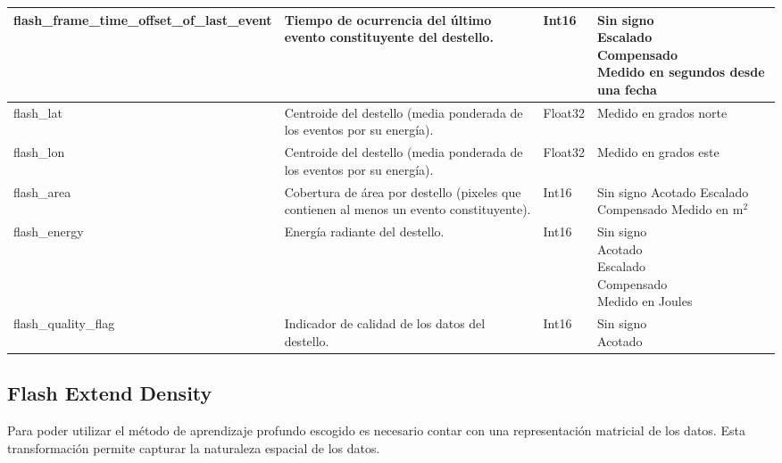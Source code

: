 \begin{table}[H]
\begin{tabular}{l|p{3cm}|p{1.15cm}|p{3.5cm}}
    flash\_frame\_time\_offset\_of\_last\_event &
    Tiempo de ocurrencia del último evento constituyente del destello. &
    Int16 &
    \parbox[t]{3.5cm}{Sin signo \\ Escalado \\ Compensado \\ Medido en segundos desde una fecha}\\ \hline

    flash\_lat &
    Centroide del destello (media ponderada de los eventos por su energía). &
    Float32 &
    \parbox[t]{3.5cm}{Medido en grados norte}\\ \hline

    flash\_lon &
    Centroide del destello (media ponderada de los eventos por su energía). &
    Float32 &
    \parbox[t]{3.5cm}{Medido en grados este}\\ \hline

    flash\_area &
    Cobertura de área por destello (pixeles que contienen al menos un evento constituyente). &
    Int16 &
    \parbox[t]{3.5cm}{Sin signo \\ Acotado \\ Escalado \\ Compensado \\ Medido en m$^2$}\\ \hline

    flash\_energy &
    Energía radiante del destello. &
    Int16 &
    \parbox[t]{3.5cm}{Sin signo \\ Acotado \\ Escalado \\ Compensado \\ Medido en Joules}\\ \hline

    flash\_quality\_flag &
    Indicador de calidad de los datos del destello. &
    Int16 &
    \parbox[t]{3.5cm}{Sin signo \\ Acotado }\\ 

  \end{tabular}
\end{table}

\subsection{Flash Extend Density}
Para poder utilizar el método de aprendizaje profundo escogido es necesario 
contar con una representación matricial de los datos. Esta transformación 
permite capturar la naturaleza espacial de los datos.

